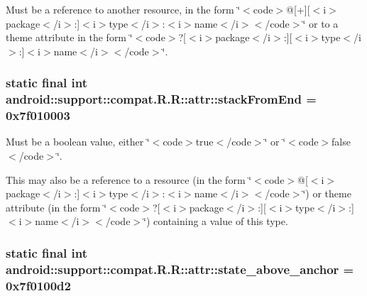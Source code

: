 Must be a reference to another resource, in the form \char`\"{}$<$code$>$@\mbox{[}+\mbox{]}\mbox{[}$<$i$>$package$<$/i$>$:\mbox{]}$<$i$>$type$<$/i$>$:$<$i$>$name$<$/i$>$$<$/code$>$\char`\"{} or to a theme attribute in the form \char`\"{}$<$code$>$?\mbox{[}$<$i$>$package$<$/i$>$:\mbox{]}\mbox{[}$<$i$>$type$<$/i$>$:\mbox{]}$<$i$>$name$<$/i$>$$<$/code$>$\char`\"{}. \hypertarget{classandroid_1_1support_1_1compat_1_1_r_1_1attr_873e51ba4b955f24febb7e56cc2e4eb5}{
\subsubsection[{stackFromEnd}]{\setlength{\rightskip}{0pt plus 5cm}static final int android::support::compat.R.R::attr::stackFromEnd = 0x7f010003}}
\label{classandroid_1_1support_1_1compat_1_1_r_1_1attr_873e51ba4b955f24febb7e56cc2e4eb5}


Must be a boolean value, either \char`\"{}$<$code$>$true$<$/code$>$\char`\"{} or \char`\"{}$<$code$>$false$<$/code$>$\char`\"{}. 

This may also be a reference to a resource (in the form \char`\"{}$<$code$>$@\mbox{[}$<$i$>$package$<$/i$>$:\mbox{]}$<$i$>$type$<$/i$>$:$<$i$>$name$<$/i$>$$<$/code$>$\char`\"{}) or theme attribute (in the form \char`\"{}$<$code$>$?\mbox{[}$<$i$>$package$<$/i$>$:\mbox{]}\mbox{[}$<$i$>$type$<$/i$>$:\mbox{]}$<$i$>$name$<$/i$>$$<$/code$>$\char`\"{}) containing a value of this type. \hypertarget{classandroid_1_1support_1_1compat_1_1_r_1_1attr_e6b3bb8b4eccb670fcba9373170c7f02}{
\subsubsection[{state\_\-above\_\-anchor}]{\setlength{\rightskip}{0pt plus 5cm}static final int android::support::compat.R.R::attr::state\_\-above\_\-anchor = 0x7f0100d2}}
\label{classandroid_1_1support_1_1compat_1_1_r_1_1attr_e6b3bb8b4eccb670fcba9373170c7f02}


